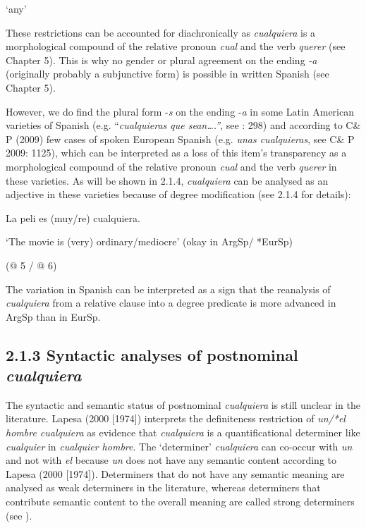   ‘any’

These restrictions can be accounted for diachronically as \textit{cualquiera} is a morphological compound of the relative pronoun \textit{cual} and the verb \textit{querer} (see Chapter 5). This is why no gender or plural agreement on the ending \textit{{}-a} (originally probably a subjunctive form) is possible in written Spanish (see Chapter 5).

  However, we do find the plural form -\textit{s} on the ending -\textit{a} in some Latin American varieties of Spanish (e.g. “\textit{cualquieras que sean….”}, see \citealt{Rainer1993}: 298) and according to C\& P (2009) few cases of spoken European Spanish (e.g. \textit{unas cualquieras}, see C\& P 2009: 1125), which can be interpreted as a loss of this item’s transparency as a morphological compound of the relative pronoun \textit{cual} and the verb \textit{querer} in these varieties. As will be shown in 2.1.4, \textit{cualquiera} can be analysed as an adjective in these varieties because of degree modification (see 2.1.4 for details):

  La peli es (muy/re) cualquiera. 

‘The movie is (very) ordinary/mediocre’  (okay in ArgSp/ *EurSp)

  (@ 5 / @ 6)

The variation in Spanish can be interpreted as a sign that the reanalysis of \textit{cualquiera} from a relative clause into a degree predicate is more advanced in ArgSp than in EurSp. 

\subsection{\textbf{2.1.3} \textbf{Syntactic} \textbf{analyses} \textbf{of} \textbf{postnominal} \textbf{\textit{cualquiera}}}

The syntactic and semantic status of postnominal \textit{cualquiera} is still unclear in the literature. Lapesa (2000 [1974]) interprets the definiteness restriction of \textit{un/*el hombre cualquiera} as evidence that \textit{cualquiera} is a quantificational determiner like \textit{cualquier} in \textit{cualquier hombre}. The ‘determiner’ \textit{cualquiera} can co-occur with \textit{un} and not with \textit{el} because \textit{un} does not have any semantic content according to Lapesa (2000 [1974]). Determiners that do not have any semantic meaning are analysed as weak determiners in the literature, whereas determiners that contribute semantic content to the overall meaning are called strong determiners (see \citealt{Zamparelli2000}). 

